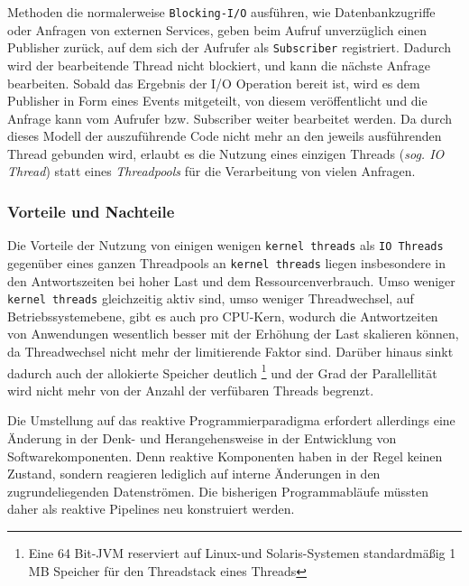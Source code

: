 Methoden die normalerweise \verb|Blocking-I/O| ausführen, wie Datenbankzugriffe oder Anfragen von externen Services,
geben beim Aufruf unverzüglich einen Publisher zurück, auf dem sich der Aufrufer als \verb|Subscriber| registriert.
Dadurch wird der bearbeitende Thread nicht blockiert, und kann die nächste Anfrage bearbeiten.
Sobald das Ergebnis der I/O Operation bereit ist, wird es dem Publisher in Form eines Events mitgeteilt, von diesem veröffentlicht und die Anfrage kann
vom Aufrufer bzw. Subscriber weiter bearbeitet werden.
Da durch dieses Modell der auszuführende Code nicht mehr an den jeweils ausführenden Thread gebunden wird, erlaubt es die Nutzung eines einzigen
Threads (\textit{sog. IO Thread}) statt eines \textit{Threadpools} für die Verarbeitung von vielen Anfragen.

\subsubsection{Vorteile und Nachteile}
\label{section:vorteile_nachteile}

Die Vorteile der Nutzung von einigen wenigen \verb|kernel threads| als \verb|IO Threads| gegenüber eines ganzen Threadpools
an \verb|kernel threads| liegen insbesondere in den Antwortszeiten bei hoher Last und dem Ressourcenverbrauch.
Umso weniger \verb|kernel threads| gleichzeitig aktiv sind, umso weniger Threadwechsel, auf Betriebssystemebene,
gibt es auch pro CPU-Kern, wodurch die Antwortzeiten von Anwendungen
wesentlich besser mit der Erhöhung der Last skalieren können, da Threadwechsel nicht mehr der limitierende Faktor sind.
Darüber hinaus sinkt dadurch auch der allokierte Speicher deutlich
\footnote{Eine 64 Bit-JVM reserviert auf Linux-und Solaris-Systemen standardmäßig 1 MB Speicher für den Threadstack eines Threads}
und der Grad der Parallellität wird nicht mehr von der Anzahl der verfübaren Threads begrenzt.

Die Umstellung auf das reaktive Programmierparadigma erfordert allerdings eine Änderung in der Denk- und Herangehensweise in der
Entwicklung von Softwarekomponenten. Denn reaktive Komponenten haben in der Regel keinen Zustand,
sondern reagieren lediglich auf interne Änderungen in den zugrundeliegenden Datenströmen.
Die bisherigen Programmabläufe müssten daher als reaktive Pipelines neu konstruiert werden.

